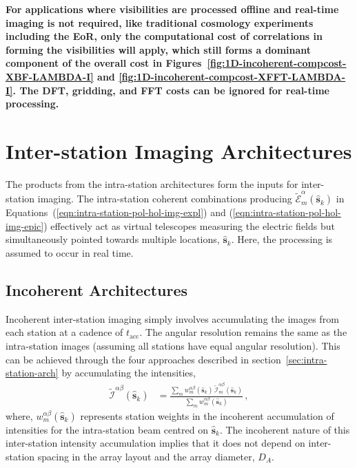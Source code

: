 \documentclass[
  journal=pasa,
  manuscript=article-type,
  year=2020,
  volume=37,
]{cup-journal}
\begin{document}
\textbf{For applications where visibilities are processed offline and real-time imaging is not required, like traditional cosmology experiments including the EoR, only the computational cost of correlations in forming the visibilities will apply, which still forms a dominant component of the overall cost in Figures~\ref{fig:1D-incoherent-compcost-XBF-LAMBDA-I} and \ref{fig:1D-incoherent-compcost-XFFT-LAMBDA-I}. The DFT, gridding, and FFT costs can be ignored for real-time processing.}

\section{Inter-station Imaging Architectures} \label{sec:inter-station-arch}

The products from the intra-station architectures form the inputs for inter-station imaging. The intra-station coherent combinations producing $\widetilde{\mathcal{E}}_m^\alpha(\hat{\boldsymbol{s}}_k)$ in Equations~(\ref{eqn:intra-station-pol-hol-img-expl}) and (\ref{eqn:intra-station-pol-hol-img-epic}) effectively act as virtual telescopes measuring the electric fields but simultaneously pointed towards multiple locations, $\hat{\boldsymbol{s}}_k$. Here, the processing is assumed to occur in real time. 

\subsection{Incoherent Architectures} \label{sec:incoherent}

Incoherent inter-station imaging simply involves accumulating the images from each station at a cadence of $t_\textrm{acc}$. The angular resolution remains the same as the intra-station images (assuming all stations have equal angular resolution). This can be achieved through the four approaches described in section~\ref{sec:intra-station-arch} by accumulating the intensities, 
\begin{align}
    \widetilde{\mathcal{I}}^{\alpha\beta}(\hat{\boldsymbol{s}}_k) &= \frac{\sum_m w_{m}^{\alpha\beta}(\hat{\boldsymbol{s}}_k) \, \widetilde{\mathcal{I}}_m^{\alpha\beta}(\hat{\boldsymbol{s}}_k)}{\sum_m w_{m}^{\alpha\beta}(\hat{\boldsymbol{s}}_k)} \, , \label{eqn:inter-station-incoherent-pol-images}
\end{align}
where, $w_{m}^{\alpha\beta}(\hat{\boldsymbol{s}}_k)$ represents station weights in the incoherent accumulation of intensities for the intra-station beam centred on $\hat{\boldsymbol{s}}_k$. The incoherent nature of this inter-station intensity accumulation implies that it does not depend on inter-station spacing in the array layout and the array diameter, $D_A$. 
\end{document}

